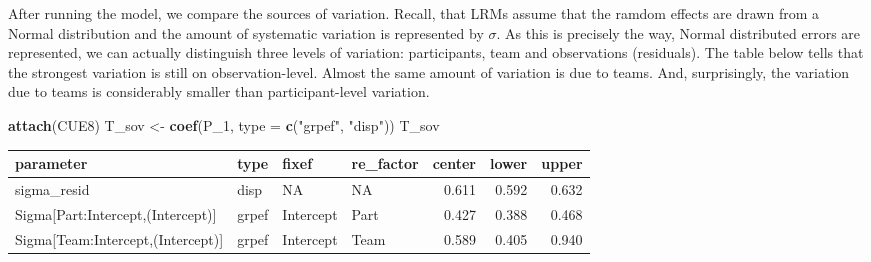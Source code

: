 \documentclass[]{svmono}
\newenvironment{Shaded}{\begin{snugshade}}{\end{snugshade}}
\newcommand{\KeywordTok}[1]{\textcolor[rgb]{0.13,0.29,0.53}{\textbf{#1}}}
\newcommand{\DataTypeTok}[1]{\textcolor[rgb]{0.13,0.29,0.53}{#1}}
\newcommand{\DecValTok}[1]{\textcolor[rgb]{0.00,0.00,0.81}{#1}}
\newcommand{\StringTok}[1]{\textcolor[rgb]{0.31,0.60,0.02}{#1}}
\newcommand{\OperatorTok}[1]{\textcolor[rgb]{0.81,0.36,0.00}{\textbf{#1}}}
\newcommand{\NormalTok}[1]{#1}
\begin{document}
\begin{Shaded}
\end{Shaded}

After running the model, we compare the sources of variation. Recall,
that LRMs assume that the ramdom effects are drawn from a Normal
distribution and the amount of systematic variation is represented by
\(\sigma\). As this is precisely the way, Normal distributed errors are
represented, we can actually distinguish three levels of variation:
participants, team and observations (residuals). The table below tells
that the strongest variation is still on observation-level. Almost the
same amount of variation is due to teams. And, surprisingly, the
variation due to teams is considerably smaller than participant-level
variation.

\begin{Shaded}
\begin{Highlighting}[]
\KeywordTok{attach}\NormalTok{(CUE8)}
\NormalTok{T_sov <-}\StringTok{ }\KeywordTok{coef}\NormalTok{(P_}\DecValTok{1}\NormalTok{, }\DataTypeTok{type =} \KeywordTok{c}\NormalTok{(}\StringTok{"grpef"}\NormalTok{, }\StringTok{"disp"}\NormalTok{))}
\NormalTok{T_sov}
\end{Highlighting}
\end{Shaded}

\begin{longtable}[]{@{}llllrrr@{}}
\toprule
parameter & type & fixef & re\_factor & center & lower &
upper\tabularnewline
\midrule
\endhead
sigma\_resid & disp & NA & NA & 0.611 & 0.592 & 0.632\tabularnewline
Sigma{[}Part:Intercept,(Intercept){]} & grpef & Intercept & Part & 0.427
& 0.388 & 0.468\tabularnewline
Sigma{[}Team:Intercept,(Intercept){]} & grpef & Intercept & Team & 0.589
& 0.405 & 0.940\tabularnewline
\bottomrule
\end{longtable}
\end{document}
